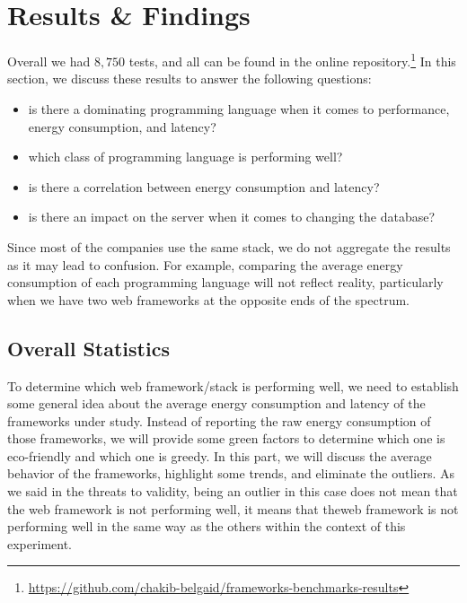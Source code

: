 \section{Results \& Findings}
Overall we had $8,750$ tests, and all can be found in the online repository.\footnote{\url{https://github.com/chakib-belgaid/frameworks-benchmarks-results}}
In this section, we discuss these results to answer the following questions:
\begin{itemize}
    \item is there a dominating programming language when it comes to performance, energy consumption, and latency?
    \item which class of programming language is performing well?
    \item is there a correlation between energy consumption and latency?
    \item is there an impact on the server when it comes to changing the database?
\end{itemize}

Since most of the companies use the same stack, we do not aggregate the results as it may lead to confusion.
For example, comparing the average energy consumption of each programming language will not reflect reality, particularly when we have two web frameworks at the opposite ends of the spectrum.

\subsection{Overall Statistics}
To determine which web framework/stack is performing well, we need to establish some general idea about the average energy consumption and latency of the frameworks under study.
Instead of reporting the raw energy consumption of those frameworks, we will provide some green factors to determine which one is eco-friendly and which one is greedy.
In this part, we will discuss the average behavior of the frameworks, highlight some trends, and eliminate the outliers.
As we said in the threats to validity, being an outlier in this case does not mean that the web framework is not performing well, it means that theweb framework is not performing well in the same way as the others within the context of this experiment.

